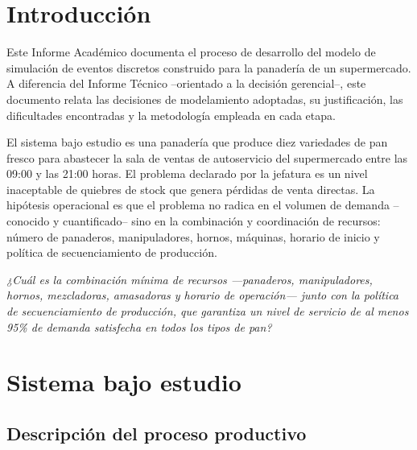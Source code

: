 \documentclass[12pt]{article}
\begin{document}
\tableofcontents

\newpage
\section{Introducción}

Este Informe Académico documenta el proceso de desarrollo del modelo de simulación de eventos discretos construido para la panadería de un supermercado. A diferencia del Informe Técnico --orientado a la decisión gerencial--, este documento relata las decisiones de modelamiento adoptadas, su justificación, las dificultades encontradas y la metodología empleada en cada etapa.

El sistema bajo estudio es una panadería que produce diez variedades de pan fresco para abastecer la sala de ventas de autoservicio del supermercado entre las 09:00 y las 21:00 horas. El problema declarado por la jefatura es un nivel inaceptable de quiebres de stock que genera pérdidas de venta directas. La hipótesis operacional es que el problema no radica en el volumen de demanda --conocido y cuantificado-- sino en la combinación y coordinación de recursos: número de panaderos, manipuladores, hornos, máquinas, horario de inicio y política de secuenciamiento de producción.

\medskip
\noindent\colorbox{grisclaro}{%
\parbox{\dimexpr\linewidth-2\fboxsep\relax}{%
\vspace{2pt}
\textit{¿Cuál es la combinación mínima de recursos ---panaderos, manipuladores, hornos, mezcladoras, amasadoras y horario de operación--- junto con la política de secuenciamiento de producción, que garantiza un nivel de servicio de al menos 95\% de demanda satisfecha en todos los tipos de pan?}
\vspace{2pt}
}}

\newpage
\section{Sistema bajo estudio}

\subsection{Descripción del proceso productivo}
\end{document}
